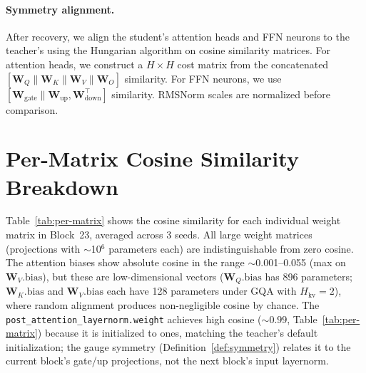 \documentclass{article}
\newcommand{\bW}{\mathbf{W}}
\begin{document}
\paragraph{Symmetry alignment.}
After recovery, we align the student's attention heads and FFN neurons to the teacher's using the Hungarian algorithm on cosine similarity matrices. For attention heads, we construct a $H \times H$ cost matrix from the concatenated $[\bW_Q \| \bW_K \| \bW_V \| \bW_O]$ similarity. For FFN neurons, we use $[\bW_\text{gate} \| \bW_\text{up}, \bW_\text{down}^\top]$ similarity. RMSNorm scales are normalized before comparison.

\section{Per-Matrix Cosine Similarity Breakdown}
\label{app:per-matrix}

Table~\ref{tab:per-matrix} shows the cosine similarity for each individual weight matrix in Block~23, averaged across 3 seeds. All large weight matrices (projections with $\sim$10$^6$ parameters each) are indistinguishable from zero cosine. The attention biases show absolute cosine in the range $\sim$0.001--0.055 (max on $\bW_V.\text{bias}$), but these are low-dimensional vectors ($\bW_Q.\text{bias}$ has 896 parameters; $\bW_K.\text{bias}$ and $\bW_V.\text{bias}$ each have 128 parameters under GQA with $H_{\text{kv}}{=}2$), where random alignment produces non-negligible cosine by chance. The \texttt{post\_attention\_layernorm.weight} achieves high cosine ($\sim 0.99$, Table~\ref{tab:per-matrix}) because it is initialized to ones, matching the teacher's default initialization; the gauge symmetry (Definition~\ref{def:symmetry}) relates it to the current block's gate/up projections, not the next block's input layernorm.
\end{document}
